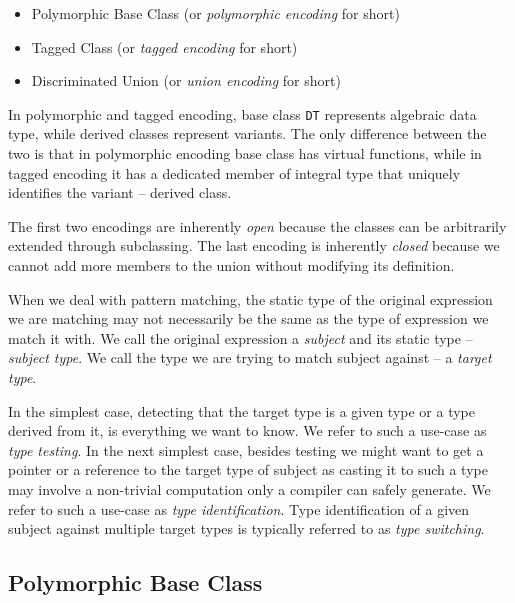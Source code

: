\documentclass[preprint]{sigplanconf}
\makeatletter
\DeclareRobustCommand{\code}[1]{{\lstinline[breaklines=false,escapechar=@]{#1}}}
\makeatother
\begin{document}
\begin{itemize}
\setlength{\itemsep}{0pt}
\setlength{\parskip}{0pt}
\item Polymorphic Base Class (or \emph{polymorphic encoding} for short)
\item Tagged Class (or \emph{tagged encoding} for short)
\item Discriminated Union (or \emph{union encoding} for short)
\end{itemize}

\noindent
In polymorphic and tagged encoding, base class \code{DT} represents algebraic 
data type, while derived classes represent variants. The only difference between 
the two is that in polymorphic encoding base class has virtual functions, while 
in tagged encoding it has a dedicated member of integral type that uniquely 
identifies the variant -- derived class. 

The first two encodings are inherently \emph{open} because the classes can be 
arbitrarily extended through subclassing. The last encoding is inherently 
\emph{closed} because we cannot add more members to the union without modifying 
its definition.


When we deal with pattern matching, the static type of the original expression 
we are matching may not necessarily be the same as the type of expression we 
match it with. We call the original expression a \emph{subject} and its static 
type -- \emph{subject type}. We call the type we are trying to match subject 
against -- a \emph{target type}.

In the simplest case, detecting that the target type is a given type or a type 
derived from it, is everything we want to know. We refer to such a use-case as 
\emph{type testing}. In the next simplest case, besides testing we might want to 
get a pointer or a reference to the target type of subject as casting it to such 
a type may involve a non-trivial computation only a compiler can safely 
generate. We refer to such a use-case as \emph{type identification}. Type 
identification of a given subject against multiple target types is typically 
referred to as \emph{type switching}.

\subsection{Polymorphic Base Class}
\label{sec:pbc}
\end{document}
